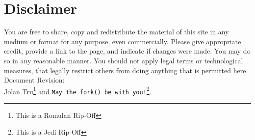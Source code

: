 \documentclass[12pt]{article}
\begin{document}
\section{Disclaimer}

You are free to share, copy and redistribute the material of this site 
in any medium or format for any purpose, even commercially. 
Please give appropriate credit, provide a link to the page, 
and indicate if changes were made. You may do so in any reasonable manner. 
You should not apply legal terms or technological measures, 
that legally restrict others from doing anything that is permitted here.
\\[1pt]

\null\hfill Document Revision: \rev%
\\[1pt]

\null\hfill Jolan Tru\footnote{This is a Romulan Rip-Off}
and \texttt{May the fork() be with you!}\footnote{This is a Jedi Rip-Off}.

\end{document}
